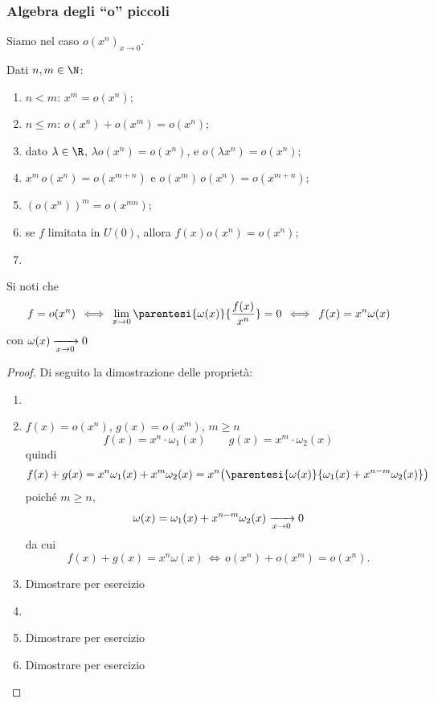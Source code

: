 \subsubsection{Algebra degli ``o'' piccoli}

Siamo nel caso $ o(x^{n})_{x\to 0}  $.

Dati $ n, m \in \N $: \begin{enumerate}
    \item $ n<m $: $ x^{m}=o(x^{n}) $;
    \item $ n\le m $: $ o(x^{n} ) + o(x^{m}) = o(x^{n}) $;
    \item dato $ \lambda \in \R $, $ \lambda o (x^{n})=o(x^{n}) $, e $ o( \lambda x^{n}) = o(x^{n}) $;
    \item $ x^{m}\,o(x^{n}) = o(x^{m+n}) $ e $ o(x^{m})\,o(x^{n})= o(x^{m+n}) $;
    \item $ \left(o(x^{n})\right)^{m}=o(x^{mn}) $;
    \item se $ f $ limitata in $ U(0) $, allora $ f(x)o(x^{n})=o(x^{n}) $;
    \item 
\end{enumerate}

Si noti che \[
    f=o(x^{n})\,\iff\, \lim_{x\to 0} \parentesi{\omega(x)}{\frac{f(x)}{x^{n}}} =0\,\iff\, f(x)= x^{n}\omega(x)
\] con $ \omega(x) \xrightarrow[x\to 0]{} 0 \displaystyle $

\begin{proof}
    Di seguito la dimostrazione delle proprietà:
    \begin{enumerate}
        \item {}
        \item $ f(x)=o(x^{n}) $, $ g(x)=o(x^{m}) $, $ m\ge n $ \[
            f(x)=x^{n} \cdot \omega_{1}(x)\qquad g(x)=x^{m} \cdot \omega_2(x)  
        \] quindi \[
            f(x)+g(x)=x^{n} \omega_1(x)+ x^{m}\omega_2(x)=x^{n}\bigl(\parentesi{\omega(x)}{\omega_1(x)+x^{n-m}\omega_2(x)}\bigr)
        \] poiché $ m\ge n $, \[
            \omega(x)=\omega_1(x)+x^{n-m}\omega_2(x) \xrightarrow[x\to 0]{} 0 \displaystyle
        \] da cui \[
            f(x)+g(x)=x^{n}\omega(x) \,\iff\, o(x^{n}) + o(x^{m})=o(x^{n}).
        \]
        \item Dimostrare per esercizio %
        \item {}
        \item Dimostrare per esercizio %
        \item Dimostrare per esercizio %
        \qedhere
    \end{enumerate}
\end{proof}


